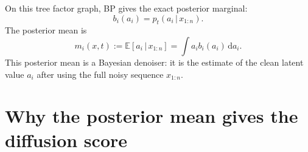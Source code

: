 \documentclass[11pt]{article}
\newcommand{\E}{\mathbb{E}}
\newcommand{\dd}{\,\mathrm{d}}
\newcommand{\given}{\,|\,}
\begin{document}
On this tree factor graph, BP gives the exact posterior marginal:
\begin{equation}
  b_i(a_i)=p_t(a_i\given x_{1:n}).
\end{equation}
The posterior mean is
\begin{equation}
  m_i(x,t)
  :=\E[a_i\given x_{1:n}]
  =\int a_i b_i(a_i)\dd a_i.
  \label{eq:posterior-mean}
\end{equation}
This posterior mean is a Bayesian denoiser: it is the estimate of the clean latent value \(a_i\) after using the full noisy sequence \(x_{1:n}\).

\section{Why the posterior mean gives the diffusion score}
\end{document}
